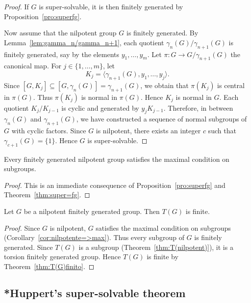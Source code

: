 \begin{proof}
    If $G$ is super-solvable, it is then finitely generated by 
    Proposition~\ref{pro:superfg}.  
    
    Now assume that the nilpotent group $G$ is finitely generated. By Lemma~\ref{lem:gamma_n/gamma_n+1}, 
    each quotient $\gamma_{n}(G)/\gamma_{n+1}(G)$ is finitely generated, say by 
    the elements $y_1,\dots,y_m$. Let $\pi\colon G\to G/\gamma_{n+1}(G)$ the canonical map. 
    For $j\in\{1,\dots,m\}$, let 
    \[
    K_j=\langle \gamma_{n+1}(G),y_1,\dots,y_j\rangle.
    \]
    Since $[G,K_j]\subseteq [G,\gamma_n(G)]=\gamma_{n+1}(G)$, 
    we obtain that $\pi(K_j)$ is central in $\pi(G)$. Thus $\pi(K_j)$ is normal
    in $\pi(G)$. Hence $K_j$ is normal in $G$. Each quotient $K_j/K_{j-1}$
    is cyclic and generated by $y_jK_{j-1}$. Therefore, in between $\gamma_n(G)$ and 
    $\gamma_{n+1}(G)$, we have constructed a sequence of normal subgroups of $G$ 
    with cyclic factors. Since $G$ is nilpotent, there exists an integer $c$ such that 
    $\gamma_{c+1}(G)=\{1\}$. Hence $G$ is super-solvable. 
\end{proof}

\begin{corollary}
	\label{cor:nilpotente=>max}
    Every finitely generated nilpotent group satisfies the maximal condition on subgroups. 
\end{corollary}

\begin{proof}
    This is an immediate consequence of Proposition~\ref{pro:superfg} and 
    Theorem~\ref{thm:super=fg}.  
\end{proof}

\begin{theorem}
    Let $G$ be a nilpotent finitely generated group. Then $T(G)$ is finite. 
\end{theorem}

\begin{proof}
    Since $G$ is nilpotent, $G$ satisfies the maximal condition on subgroups 
    (Corollary~\ref{cor:nilpotente=>max}). Thus 
	every subgroup of $G$ is finitely generated. Since 
    $T(G)$ is a subgroup (Theorem~\ref{thm:T(nilpotent)}), it is a torsion finitely generated group. 
	Hence $T(G)$ is finite by Theorem~\ref{thm:T(G)finito}.
\end{proof}

\subsection{*Huppert's super-solvable theorem}

